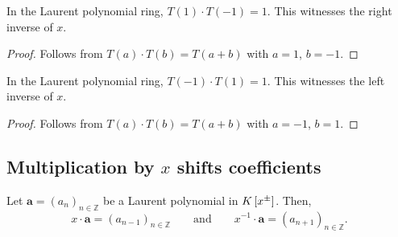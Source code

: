 \begin{lemma}[$T(1) \cdot T(-1) = 1$]
\label{lem.fps.laure.T-inv}
\leanhelper
\leanok
In the Laurent polynomial ring, $T(1) \cdot T(-1) = 1$.
This witnesses the right inverse of $x$.
\end{lemma}

\begin{proof}
\leanok
Follows from $T(a) \cdot T(b) = T(a+b)$ with $a = 1$, $b = -1$.
\end{proof}

\begin{lemma}[$T(-1) \cdot T(1) = 1$]
\label{lem.fps.laure.T-neg-one-mul-T}
\leanhelper
\leanok
In the Laurent polynomial ring, $T(-1) \cdot T(1) = 1$.
This witnesses the left inverse of $x$.
\end{lemma}

\begin{proof}
\leanok
Follows from $T(a) \cdot T(b) = T(a+b)$ with $a = -1$, $b = 1$.
\end{proof}

\subsection{Multiplication by $x$ shifts coefficients}

\begin{lemma}
\label{lem.fps.laure.xa}
\leantarget
\leanok
Let $\mathbf{a} = \left(a_n\right)_{n \in \mathbb{Z}}$ be a Laurent
polynomial in $K\left[x^{\pm}\right]$. Then,
\[
  x \cdot \mathbf{a} = \left(a_{n-1}\right)_{n \in \mathbb{Z}}
  \qquad \text{and} \qquad
  x^{-1} \cdot \mathbf{a} = \left(a_{n+1}\right)_{n \in \mathbb{Z}}.
\]
\end{lemma}

